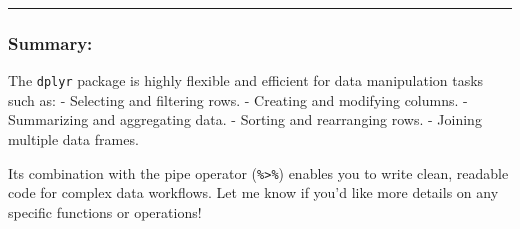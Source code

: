 \documentclass[
  letterpaper,
  DIV=11,
  numbers=noendperiod]{scrartcl}
\begin{document}
\begin{center}\rule{0.5\linewidth}{0.5pt}\end{center}

\subsubsection{Summary:}\label{summary}

The \texttt{dplyr} package is highly flexible and efficient for data
manipulation tasks such as: - Selecting and filtering rows. - Creating
and modifying columns. - Summarizing and aggregating data. - Sorting and
rearranging rows. - Joining multiple data frames.

Its combination with the pipe operator (\texttt{\%\textgreater{}\%})
enables you to write clean, readable code for complex data workflows.
Let me know if you'd like more details on any specific functions or
operations!
\end{document}
